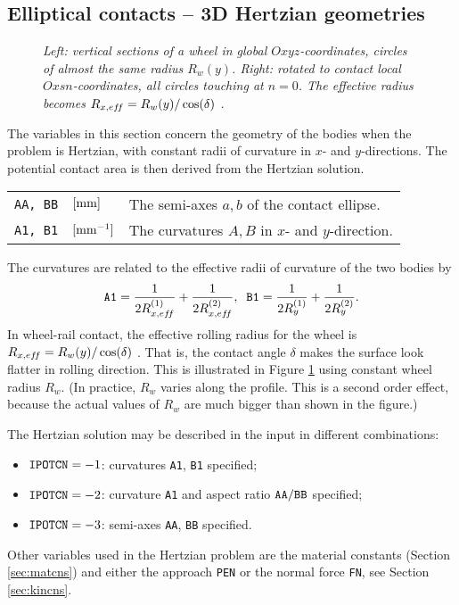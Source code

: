 \documentclass[12pt]{report}
\newenvironment{inputvars}{\vspace{0.4\baselineskip}%

\begin{tabular}{>{\raggedright}p{22mm}p{19mm}p{113mm}}}{
\end{tabular}

}
\newcommand{\inpvar}[3]{{\small\tt #1} & $#2$ & #3 \\[1ex]}
\begin{document}
\subsection{Elliptical contacts -- 3D Hertzian geometries}
\label{sec:hertz3d}

\begin{figure}[bt]
\centering
{}
\caption{\em Left: vertical sections of a wheel in global
        $Oxyz$-coordinates, circles of almost the same radius $R_w(y)$.
        Right: rotated to contact local $Oxsn$-coordinates, all circles
        touching at $n=0$. The effective radius becomes $R_{x,ef\!f}=
        R_w(y)/\cos(\delta)$ \cite{Vollebregt2018b-corrigendum}.}
\label{fig:skewed_circles}
\end{figure}

The variables in this section concern the geometry of the bodies when the
problem is Hertzian, with constant radii of curvature in $x$- and
$y$-directions. The potential contact area is then derived from the
Hertzian solution.
\begin{inputvars}
\inpvar{AA, BB}{\bunit{mm}}{The semi-axes $a,b$ of the contact ellipse.}
\inpvar{A1, B1}{\bunit{mm^{-1}}}{The curvatures $A,B$ in $x$- and $y$-direction.}
\end{inputvars}
The curvatures are related to the effective radii of curvature of the two
bodies by
\begin{equation}\label{eq:a1_b1}
   {\tt A1} = \frac{1}{2 R_{x,ef\!f}^{(1)}} + \frac{1}{2 R_{x,ef\!f}^{(2)}} , \;\;
   {\tt B1} = \frac{1}{2 R_y^{(1)}} + \frac{1}{2 R_y^{(2)}} .
\end{equation}
In wheel-rail contact, the effective rolling radius for the wheel is 
$R_{x,ef\!f}=R_w(y)/\cos(\delta)$ \cite{Vollebregt2018b-corrigendum}. 
That is, the contact angle $\delta$ makes the surface look flatter in
rolling direction. This is illustrated in Figure \ref{fig:skewed_circles}
using constant wheel radius $R_w$. (In practice, $R_w$ varies along the
profile. This is a second order effect, because the actual values of $R_w$
are much bigger than shown in the figure.)

The Hertzian solution may be described in the input in different combinations:
\begin{itemize}
\item ${\tt IPOTCN}=-1$: curvatures {\tt A1}, {\tt B1} specified;
\item ${\tt IPOTCN}=-2$: curvature {\tt A1} and aspect ratio
        ${\tt AA}/{\tt BB}$ specified;
\item ${\tt IPOTCN}=-3$: semi-axes {\tt AA}, {\tt BB} specified.
\end{itemize}
Other variables used in the Hertzian problem are the material constants
(Section \ref{sec:matcns}) and either the approach {\tt PEN} or the
normal force {\tt FN}, see Section \ref{sec:kincns}.
\end{document}

